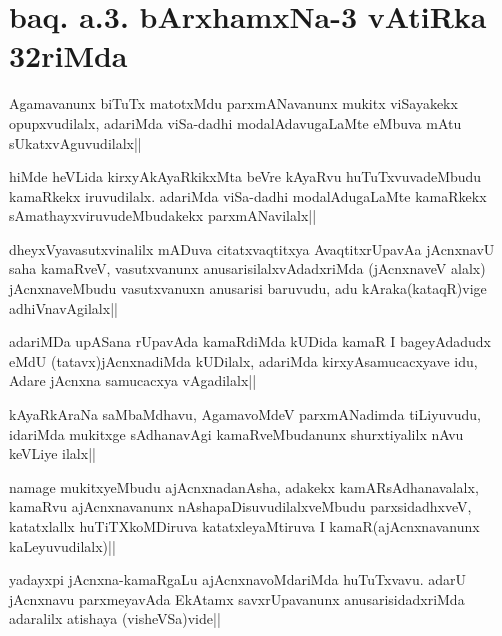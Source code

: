 \section*{baq. a.3. bArxhamxNa-3 vAtiRka 32riMda}

\begin{artha}
Agamavanunx biTuTx matotxMdu parxmANavanunx mukitx viSayakekx opupxvudilalx, adariMda 
viSa-dadhi modalAdavugaLaMte eMbuva mAtu sUkatxvAguvudilalx||
\end{artha}

\begin{artha}
hiMde heVLida kirxyAkAyaRkikxMta beVre kAyaRvu huTuTxvuvadeMbudu kamaRkekx iruvudilalx. adariMda viSa-dadhi modalAdugaLaMte kamaRkekx sAmathayxviruvudeMbudakekx parxmANavilalx||
\end{artha}


\begin{artha}
dheyxVyavasutxvinalilx mADuva citatxvaqtitxya AvaqtitxrUpavAa jAcnxnavU saha kamaRveV, vasutxvanunx anusarisilalxvAdadxriMda (jAcnxnaveV alalx) jAcnxnaveMbudu vasutxvanuxn anusarisi baruvudu, adu kAraka(kataqR)vige adhiVnavAgilalx||
\end{artha}

\begin{artha}
adariMDa upASana rUpavAda kamaRdiMda kUDida kamaR I bageyAdadudx eMdU (tatavx)jAcnxnadiMda kUDilalx, adariMda kirxyAsamucacxyave idu, Adare jAcnxna samucacxya vAgadilalx||
\end{artha}


\begin{artha}
kAyaRkAraNa saMbaMdhavu, AgamavoMdeV parxmANadimda tiLiyuvudu, idariMda mukitxge sAdhanavAgi kamaRveMbudanunx shurxtiyalilx nAvu keVLiye ilalx||
\end{artha}


\begin{artha}
namage mukitxyeMbudu ajAcnxnadanAsha, adakekx kamARsAdhanavalalx, kamaRvu ajAcnxnavanunx nAshapaDisuvudilalxveMbudu parxsidadhxveV, katatxlallx huTiTXkoMDiruva katatxleyaMtiruva I kamaR(ajAcnxnavanunx kaLeyuvudilalx)||
\end{artha}


\begin{artha}
yadayxpi jAcnxna-kamaRgaLu ajAcnxnavoMdariMda huTuTxvavu. adarU jAcnxnavu parxmeyavAda EkAtamx savxrUpavanunx anusarisidadxriMda adaralilx atishaya (visheVSa)vide||
\end{artha}

